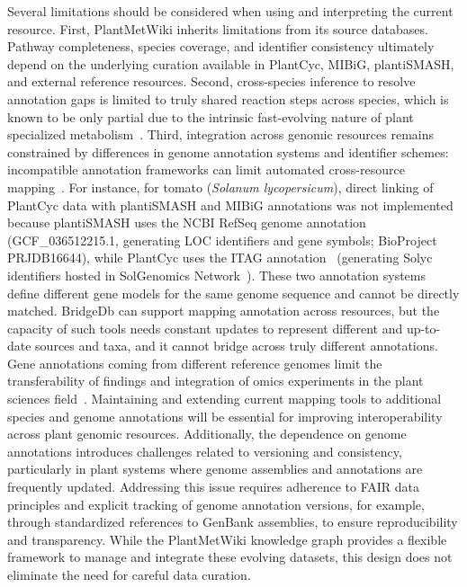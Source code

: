 \documentclass[11pt,a4paper]{article}
\begin{document}
Several limitations should be considered when using and interpreting the current resource. First,
PlantMetWiki inherits limitations from its source databases. Pathway completeness, species coverage,
and identifier consistency ultimately depend on the underlying curation available in PlantCyc, MIBiG,
plantiSMASH, and external reference resources. Second, cross-species inference to resolve annotation
gaps is limited to truly shared reaction steps across species, which is known to be only partial due
to the intrinsic fast-evolving nature of plant specialized metabolism~\cite{weng2012,dadras2025}.
Third, integration across genomic resources remains constrained by differences in genome annotation
systems and identifier schemes: incompatible annotation frameworks can limit automated cross-resource
mapping~\cite{monnahan2020}. For instance, for tomato (\textit{Solanum lycopersicum}), direct linking
of PlantCyc data with plantiSMASH and MIBiG annotations was not implemented because plantiSMASH uses
the NCBI RefSeq genome annotation (GCF\_036512215.1, generating LOC identifiers and gene symbols;
BioProject PRJDB16644), while PlantCyc uses the ITAG annotation~\cite{sato2012} (generating Solyc
identifiers hosted in SolGenomics Network~\cite{fernandez2015}). These two annotation systems define
different gene models for the same genome sequence and cannot be directly matched. BridgeDb can
support mapping annotation across resources, but the capacity of such tools needs constant updates to represent different and up-to-date sources and taxa, and it cannot bridge across truly different
annotations. Gene annotations coming from different reference genomes limit the transferability of findings and integration of omics
experiments in the plant sciences field~\cite{roeder2025}. Maintaining and extending current mapping
tools to additional species and genome annotations will be essential for improving interoperability
across plant genomic resources. Additionally, the dependence on genome annotations introduces
challenges related to versioning and consistency, particularly in plant systems where genome
assemblies and annotations are frequently updated. Addressing this issue requires adherence to FAIR
data principles and explicit tracking of genome annotation versions, for example, through
standardized references to GenBank assemblies, to ensure reproducibility and transparency. While the
PlantMetWiki knowledge graph provides a flexible framework to manage and integrate these evolving datasets, this design does
not eliminate the need for careful data curation.
\end{document}
